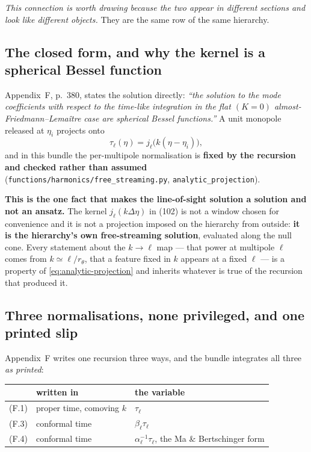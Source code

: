 \emph{This connection is worth drawing because the two appear in different
sections and look like different objects.} They are the same row of the same
hierarchy.

\subsection{The closed form, and why the kernel is a spherical Bessel function}

Appendix~F, p.~380, states the solution directly: \emph{``the solution to the
mode coefficients with respect to the time-like integration in the flat
$(K=0)$ almost-Friedmann--Lema\^itre case are spherical Bessel functions.''}
A unit monopole released at $\eta_i$ projects onto
\begin{equation}
  \tau_\ell(\eta)=j_\ell\big(k(\eta-\eta_i)\big),
  \label{eq:analytic-projection}
\end{equation}
and in this bundle the per-multipole normalisation is \textbf{fixed by the
recursion and checked rather than assumed}
(\texttt{functions/harmonics/free\_streaming.py}, \texttt{analytic\_projection}).

\textbf{This is the one fact that makes the line-of-sight solution a solution
and not an ansatz.} The kernel $j_\ell(k\Delta\eta)$ in (102) is not a window
chosen for convenience and it is not a projection imposed on the hierarchy
from outside: \textbf{it is the hierarchy's own free-streaming solution},
evaluated along the null cone. Every statement about the $k\to\ell$ map ---
that power at multipole $\ell$ comes from $k\simeq\ell/r_\theta$, that a
feature fixed in $k$ appears at a fixed $\ell$ --- is a property of
\eqref{eq:analytic-projection} and inherits whatever is true of the recursion
that produced it.

\subsection{Three normalisations, none privileged, and one printed slip}

Appendix~F writes one recursion three ways, and the bundle integrates all
three \emph{as printed}:

\begin{center}\small
\begin{tabular}{@{}lll@{}}
\toprule
 & \textbf{written in} & \textbf{the variable} \\
\midrule
(F.1) & proper time, comoving $k$ & $\tau_\ell$ \\
(F.3) & conformal time & $\beta_\ell\tau_\ell$ \\
(F.4) & conformal time & $\alpha_\ell^{-1}\tau_\ell$, the Ma \& Bertschinger form \\
\bottomrule
\end{tabular}
\end{center}


